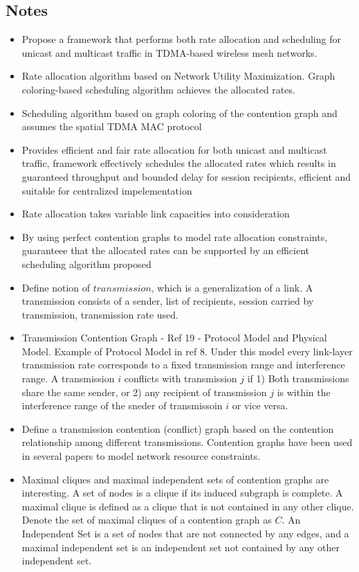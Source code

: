 \documentclass{article}
\begin{document}
\subsection{Notes}
\begin{itemize}
    \item Propose a framework that performs both rate allocation and scheduling for unicast and multicast traffic in TDMA-based wireless mesh networks.
    \item Rate allocation algorithm based on Network Utility Maximization.  Graph coloring-based scheduling algorithm achieves the allocated rates.  
    \item Scheduling algorithm based on graph coloring of the contention graph and assumes the spatial TDMA MAC protocol
    \item Provides efficient and fair rate allocation for both unicast and multicast traffic, framework effectively schedules the allocated rates which results in guaranteed throughput and bounded delay for session recipients, efficient and suitable for centralized impelementation
    \item Rate allocation takes variable link capacities into consideration
    \item By using perfect contention graphs to model rate allocation constraints, guaranteee that the allocated rates can be supported by an efficient scheduling algorithm proposed
    \item Define notion of $transmission$, which is a generalization of a link.  A transmission consists of a sender, list of recipients, session carried by transmission, transmission rate used.
    \item Transmission Contention Graph - Ref 19 - Protocol Model and Physical Model.  Example of Protocol Model in ref 8. Under this model every link-layer transmission rate corresponds to a fixed transmission range and interference range.  A transmission $i$ conflicts with transmission $j$ if 1) Both transmissions share the same sender, or 2) any recipient of transmission $j$ is within the interference range of the sneder of transmissoin $i$ or vice versa.
    \item Define a transmission contention (conflict) graph based on the contention relationship among different transmissions.  Contention graphs have been used in several papers to model network resource constraints.
    \item Maximal cliques and maximal independent sets of contention graphs are interesting.  A set of nodes is a clique if its induced subgraph is complete.  A maximal clique is defined as a clique that is not contained in any other clique.  Denote the set of maximal cliques of a contention graph as $C$.  An Independent Set is a set of nodes that are not connected by any edges, and a maximal independent set is an independent set not contained by any other independent set.

\end{itemize}
\end{document}
